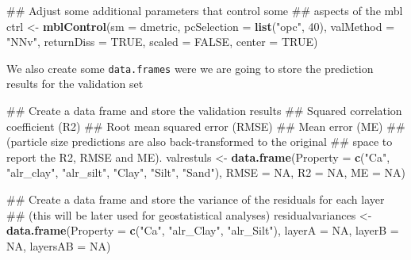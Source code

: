 \documentclass[]{book}
\newenvironment{Shaded}{\begin{snugshade}}{\end{snugshade}}
\newcommand{\DataTypeTok}[1]{\textcolor[rgb]{0.13,0.29,0.53}{#1}}
\newcommand{\DecValTok}[1]{\textcolor[rgb]{0.00,0.00,0.81}{#1}}
\newcommand{\KeywordTok}[1]{\textcolor[rgb]{0.13,0.29,0.53}{\textbf{#1}}}
\newcommand{\NormalTok}[1]{#1}
\newcommand{\OtherTok}[1]{\textcolor[rgb]{0.56,0.35,0.01}{#1}}
\newcommand{\StringTok}[1]{\textcolor[rgb]{0.31,0.60,0.02}{#1}}
\begin{document}
\begin{Shaded}
\begin{Highlighting}[]
\NormalTok{## Adjust some additional parameters that control some }
\NormalTok{## aspects of the mbl}
\NormalTok{ctrl <-}\StringTok{ }\KeywordTok{mblControl}\NormalTok{(}\DataTypeTok{sm =}\NormalTok{ dmetric, }
                   \DataTypeTok{pcSelection =} \KeywordTok{list}\NormalTok{(}\StringTok{"opc"}\NormalTok{, }\DecValTok{40}\NormalTok{), }
                   \DataTypeTok{valMethod =} \StringTok{"NNv"}\NormalTok{, }
                   \DataTypeTok{returnDiss =} \OtherTok{TRUE}\NormalTok{,}
                   \DataTypeTok{scaled =} \OtherTok{FALSE}\NormalTok{, }
                   \DataTypeTok{center =} \OtherTok{TRUE}\NormalTok{)}
\end{Highlighting}
\end{Shaded}

We also create some \texttt{data.frames} were we are going to store the prediction results for the validation set

\begin{Shaded}
\begin{Highlighting}[]
\NormalTok{## Create a data frame and store the validation results}
\NormalTok{## Squared correlation coefficient (R2)}
\NormalTok{## Root mean squared error (RMSE)}
\NormalTok{## Mean error (ME)}
\NormalTok{## (particle size predictions are also back-transformed to the original }
\NormalTok{## space to report the R2, RMSE and ME).}
\NormalTok{valrestuls <-}\StringTok{ }\KeywordTok{data.frame}\NormalTok{(}\DataTypeTok{Property =} \KeywordTok{c}\NormalTok{(}\StringTok{"Ca"}\NormalTok{, }
                                      \StringTok{"alr_clay"}\NormalTok{,}
                                      \StringTok{"alr_silt"}\NormalTok{, }
                                      \StringTok{"Clay"}\NormalTok{, }
                                      \StringTok{"Silt"}\NormalTok{,}
                                      \StringTok{"Sand"}\NormalTok{),}
                         \DataTypeTok{RMSE =} \OtherTok{NA}\NormalTok{,}
                         \DataTypeTok{R2 =} \OtherTok{NA}\NormalTok{, }
                         \DataTypeTok{ME =} \OtherTok{NA}\NormalTok{)}

\NormalTok{## Create a data frame and store the variance of the residuals for each layer}
\NormalTok{## (this will be later used for geostatistical analyses)}
\NormalTok{residualvariances <-}\StringTok{ }\KeywordTok{data.frame}\NormalTok{(}\DataTypeTok{Property =} \KeywordTok{c}\NormalTok{(}\StringTok{"Ca"}\NormalTok{, }\StringTok{"alr_Clay"}\NormalTok{, }\StringTok{"alr_Silt"}\NormalTok{),}
                                \DataTypeTok{layerA =} \OtherTok{NA}\NormalTok{,}
                                \DataTypeTok{layerB =} \OtherTok{NA}\NormalTok{,}
                                \DataTypeTok{layersAB =} \OtherTok{NA}\NormalTok{)}
\end{Highlighting}
\end{Shaded}
\end{document}
